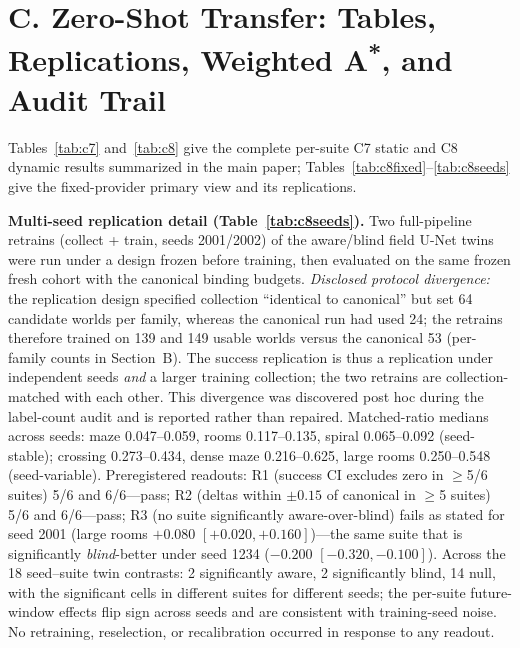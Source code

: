 \documentclass[letterpaper]{article} %
\newcommand{\stage}[1]{\textsc{#1}}
\begin{document}
\section{C. Zero-Shot Transfer: Tables, Replications, Weighted A\textsuperscript{*}, and Audit Trail}

Tables~\ref{tab:c7} and~\ref{tab:c8} give the complete per-suite \stage{C7} static and \stage{C8} dynamic results summarized in the main paper; Tables~\ref{tab:c8fixed}--\ref{tab:c8seeds} give the fixed-provider primary view and its replications.

\textbf{Multi-seed replication detail (Table~\ref{tab:c8seeds}).} Two full-pipeline retrains (collect + train, seeds 2001/2002) of the aware/blind field U-Net twins were run under a design frozen before training, then evaluated on the same frozen fresh cohort with the canonical binding budgets. \emph{Disclosed protocol divergence:} the replication design specified collection ``identical to canonical'' but set 64 candidate worlds per family, whereas the canonical run had used 24; the retrains therefore trained on 139 and 149 usable worlds versus the canonical 53 (per-family counts in Section~B). The success replication is thus a replication under independent seeds \emph{and} a larger training collection; the two retrains are collection-matched with each other. This divergence was discovered post hoc during the label-count audit and is reported rather than repaired. Matched-ratio medians across seeds: maze 0.047--0.059, rooms 0.117--0.135, spiral 0.065--0.092 (seed-stable); crossing 0.273--0.434, dense maze 0.216--0.625, large rooms 0.250--0.548 (seed-variable). Preregistered readouts: R1 (success CI excludes zero in $\geq$5/6 suites) 5/6 and 6/6---pass; R2 (deltas within $\pm 0.15$ of canonical in $\geq$5 suites) 5/6 and 6/6---pass; R3 (no suite significantly aware-over-blind) fails as stated for seed 2001 (large rooms $+0.080$ $[+0.020,+0.160]$)---the same suite that is significantly \emph{blind}-better under seed 1234 ($-0.200$ $[-0.320,-0.100]$). Across the 18 seed--suite twin contrasts: 2 significantly aware, 2 significantly blind, 14 null, with the significant cells in different suites for different seeds; the per-suite future-window effects flip sign across seeds and are consistent with training-seed noise. No retraining, reselection, or recalibration occurred in response to any readout.
\end{document}
